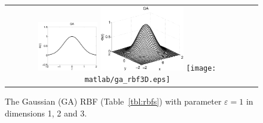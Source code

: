 \begin{figure}[t]
\centering
\begin{tabular}{cc}
\includegraphics[width=0.25\textwidth]{matlab/ga_rbf.pdf}
\includegraphics[width=0.35\textwidth]{matlab/ga_rbf2D.eps}
\texttt{[image: matlab/ga\_rbf3D.eps]}
\end{tabular} 
\caption{The Gaussian (GA) RBF (Table~\ref{tbl:rbfs}) with parameter $\varepsilon=1$ in dimensions 1, 2 and 3.}
\label{fig:rbf_examples}
\end{figure} 